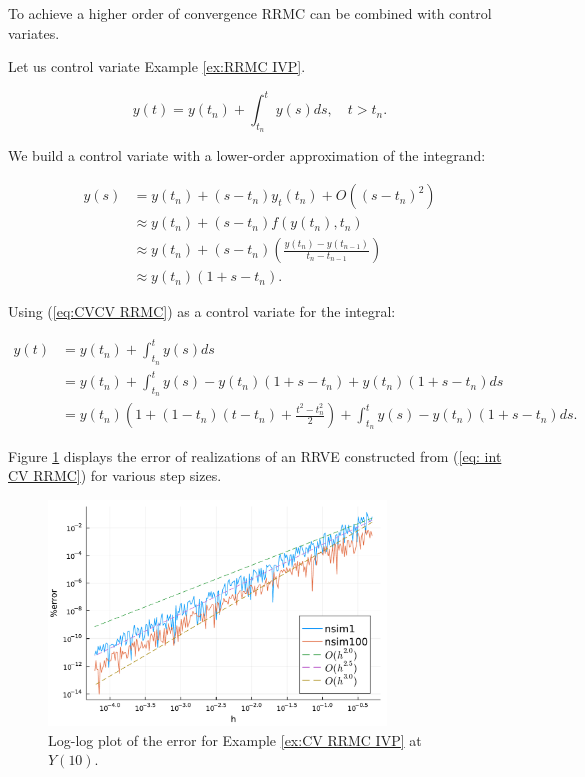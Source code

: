 \documentclass[a4paper,12pt]{article}
\begin{document}
To achieve a higher order of convergence RRMC can be combined with control variates.
\begin{example}[CV RRMC $y_t=y$]\label{ex:CV RRMC IVP}
  Let us control variate Example \ref{ex:RRMC IVP}.

  \begin{equation}
    y(t)= y(t_{n}) + \int_{t_{n}}^{t}y(s)ds , \quad t>t_{n}.
  \end{equation}

  We build a control variate with a lower-order approximation
  of the integrand:

  \begin{align}
    y(s) & = y(t_{n}) + (s-t_{n})y_t(t_{n}) + O((s-t_{n})^{2})      \\
         & \approx y(t_{n}) + (s-t_{n})f(y(t_{n}),t_{n})            \\
         & \approx y(t_{n}) +
    (s-t_{n})\left(\frac{y(t_{n})-y(t_{n-1})}{t_{n}-t_{n-1}}\right) \\
         & \approx y(t_{n})(1+s-t_{n}). \label{eq:CVCV RRMC}
  \end{align}

  Using (\ref{eq:CVCV RRMC}) as a control variate for the integral:

  \begin{align}
    y(t) & = y(t_{n}) + \int_{t_{n}}^{t}y(s)ds                                          \\
         & = y(t_{n}) + \int_{t_{n}}^{t}y(s)-y(t_{n})(1+s-t_{n}) +y(t_{n})(1+s-t_{n})ds \\
         & = y(t_{n})\left(1 + (1-t_{n})(t-t_{n})+\frac{t^{2}-t_{n}^{2}}{2}\right)
    + \int_{t_{n}}^{t}y(s)-y(t_{n})(1+s-t_{n})ds. \label{eq: int CV RRMC}
  \end{align}

  Figure \ref{fig:CV RRMC IVP} displays the error
  of realizations of an RRVE constructed from (\ref{eq: int CV RRMC})
  for various step sizes.

  \begin{figure}[h!]
    \centering
    \includegraphics[width=0.8\textwidth]{julia_plots/CV_RRMC_IVP.pdf}
    \caption{Log-log plot of the error for Example
      \ref{ex:CV RRMC IVP} at $Y(10)$.}
    \label{fig:CV RRMC IVP}
  \end{figure}
\end{example}
\end{document}
